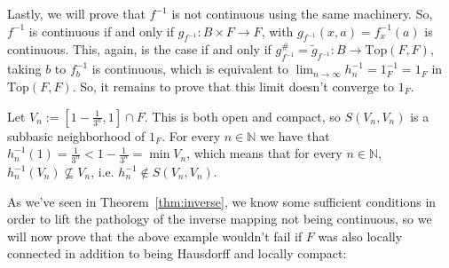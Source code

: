\begin{example}
Lastly, we will prove that $f^{-1}$ is not continuous using the same machinery. So, $f^{-1}$ is continuous if and only if $g_{f^{-1}}:B\times F\to F$, with $g_{f^{-1}}(x,a)=f^{-1}_x(a)$ is continuous. This, again, is the case if and only if $g_{f^{-1}}^{\#}=\tilde{g}_{f^{-1}}:B\to\mathrm{Top}(F,F)$, taking $b$ to $f_b^{-1}$ is continuous, which is equivalent to $\lim_{n\to\infty}h_n^{-1}=1_F^{-1}=1_F$ in $\mathrm{Top}(F,F)$. So, it remains to prove that this limit doesn't converge to $1_F$.

Let $V_n:=[1-\frac{1}{3^n},1]\cap F$. This is both open and compact, so $S(V_n,V_n)$ is a subbasic neighborhood of $1_F$. For every $n\in\mathbb{N}$ we have that $h_n^{-1}(1)=\frac{1}{3^n}<1-\frac{1}{3^n}=\min V_n$, which means that for every $n\in\mathbb{N}$, $h_n^{-1}(V_n)\not\subseteq V_n$, i.e. $h^{-1}_n\not\in S(V_n,V_n)$.
\end{example}

As we've seen in Theorem~\ref{thm:inverse}, we know some sufficient conditions in order to lift the pathology of the inverse mapping not being continuous, so we will now prove that the above example wouldn't fail if $F$ was also locally connected in addition to being Hausdorff and locally compact:


